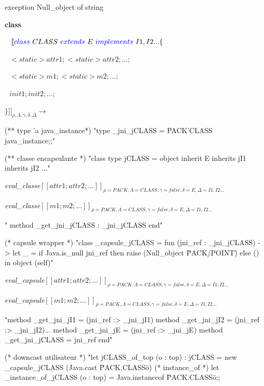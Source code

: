 \documentclass[a4paper, 11pt]{article}
\begin{document}
\begin{OCamlEx}
exception Null_object of string
\end{OCamlEx}


\newpage
\noindent
\textbf{class}

\ 
\newline
\noindent
$[\![ {\color{blue}class}\ CLASS\ 
 {\color{blue}extends}\  E \ 
 {\color{blue}implements}\  I1,I2... \{$

 $ \ \ \ <static> attr1; <static> attr2; ...;$

  $\ \ \ <static> m1; <static> m2; ...;$

  $\ \ \ init1; init2; ...;$

\noindent
 $\} ]\!]_{\rho,\Lambda,\gamma,\delta,\Delta}\longrightarrow$

\begin{OCaml}
(** type 'a java_instance*)
"type _jni_jCLASS = PACK'CLASS java_instance;;"

(** classe encapsulante *)
"class type jCLASS =
   object inherit E
   inherits jI1
   inherits jI2 ..."
\end{OCaml}

\emph{eval\_classe}$[\![attr1; attr2; ...]\!]_{\rho=PACK,\Lambda=CLASS,\gamma=false,\delta=E,\Delta=I1,I2... }$

\emph{eval\_classe}$[\![m1; m2; ...]\!]_{\rho=PACK,\Lambda=CLASS,\gamma=false,\delta=E,\Delta=I1,I2... }$

\begin{OCaml}
 "  method _get_jni_jCLASS : _jni_jCLASS
 end"

(* capsule wrapper *)
"class _capsule_jCLASS = 
  fun (jni_ref : _jni_jCLASS) ->
     let _ =
        if Java.is_null jni_ref
        then raise (Null_object \"PACK/POINT\")
        else ()
     in
    object (self)"\end{OCaml}

    \emph{eval\_capsule}$[\![attr1; attr2; ...]\!]_{\rho=PACK,\Lambda=CLASS,\gamma=false,\delta=E,\Delta=I1,I2... }$

    \emph{eval\_capsule}$[\![m1; m2; ...]\!]_{\rho=PACK,\Lambda=CLASS,\gamma=false,\delta=E,\Delta=I1,I2... }$
    \begin{OCaml}
     "method _get_jni_jI1 = (jni_ref :> _jni_jI1)
      method _get_jni_jI2 = (jni_ref :> _jni_jI2)...
      method _get_jni_jE = (jni_ref :> _jni_jE) 
      method _get_jni_jCLASS = jni_ref
    end"

(* downcast utilisateur *)
"let jCLASS_of_top (o : top) : jCLASS =
    new _capsule_jCLASS (Java.cast \"PACK.CLASS\" o)
(* instance_of *)
let _instance_of_jCLASS (o : top) =
    Java.instanceof \"PACK.CLASS\" o;;
\end{OCaml}
\end{document}
